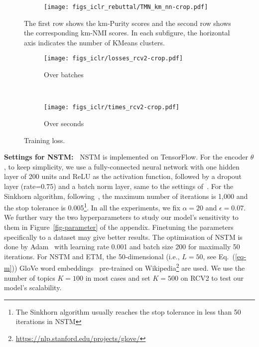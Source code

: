\documentclass{article}
\begin{document}
\begin{figure}
\begin{minipage}{0.68\textwidth}
\begin{subfigure}[b]{0.32\linewidth}
                 \centering
                 \texttt{[image: figs\_iclr\_rebuttal/TMN\_km\_nn-crop.pdf]}
         \end{subfigure}\vspace{0.3cm}
\caption{The first row shows the km-Purity scores and the second row shows the corresponding km-NMI scores. In each subfigure, the horizontal axis indicates the number of KMeans clusters.}
\label{fig-km}
\end{minipage}
\hspace{0.0005\textwidth}
\begin{minipage}{0.3\textwidth}
        \begin{subfigure}[b]{0.9\linewidth}
                 \centering
                 \caption{Over batches}
                 \texttt{[image: figs\_iclr/losses\_rcv2-crop.pdf]}
         \end{subfigure}
       \vspace{0.1cm}
        \\
         \begin{subfigure}[b]{0.9\linewidth}
                 \centering
               \caption{Over seconds}
                 \texttt{[image: figs\_iclr/times\_rcv2-crop.pdf]}
         \end{subfigure} 
\caption{Training loss.}
\label{fig-time}
\end{minipage}
\end{figure}

\textbf{Settings for NSTM:~}
NSTM is implemented on TensorFlow. For the encoder $\theta$, to keep simplicity, we use a fully-connected neural network with one hidden layer of 200 units and ReLU as the activation function, followed by a dropout layer (rate=0.75) and a batch norm layer, same to the settings of~\cite{burkhardt2019decoupling}. For the Sinkhorn algorithm, following~\cite{cuturi2013sinkhorn}, the maximum number of  iterations is 1,000 and the stop tolerance is 0.005\footnote{The Sinkhorn algorithm usually reaches the stop tolerance in less than 50 iterations in NSTM}. In all the experiments, we fix $\alpha=20$ and $\epsilon=0.07$. 
We further vary the two hyperparameters to study our model's sensitivity to them in Figure~\ref{fig-parameter} of the appendix. Finetuning the parameters specifically to a dataset may give better results. The optimisation of NSTM is done by Adam~\citep{kingma2014adam} with learning rate 0.001 and batch size 200 for maximally 50 iterations. For NSTM and ETM, the 50-dimensional (i.e., $L=50$, see Eq.~(\ref{eq-m})) GloVe word embeddings~\citep{pennington2014glove} pre-trained on Wikipedia\footnote{\url{https://nlp.stanford.edu/projects/glove/}} are used.
We use the number of topics $K=100$ in most cases and set $K=500$ on RCV2 to test our model's scalability. 
\end{document}
